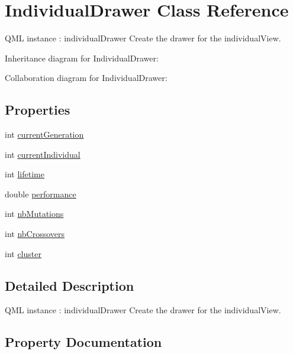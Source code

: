 \hypertarget{class_individual_drawer}{}\section{Individual\+Drawer Class Reference}
\label{class_individual_drawer}


Q\+ML instance \+: individual\+Drawer Create the drawer for the individual\+View.  




Inheritance diagram for Individual\+Drawer\+:


Collaboration diagram for Individual\+Drawer\+:
\subsection*{Properties}
\begin{DoxyCompactItemize}
\item 
int \hyperlink{class_individual_drawer_aebff3d29013ea6abdefb6e5e14b54c2e}{current\+Generation}
\item 
int \hyperlink{class_individual_drawer_aa8e4b9e5d8b6357fd5dd571dbca04a9d}{current\+Individual}
\item 
int \hyperlink{class_individual_drawer_a006e2962467eea003ae5f00287dc539b}{lifetime}
\item 
double \hyperlink{class_individual_drawer_a7d7dc8a2d50bab0ede8b3c9fad4976ac}{performance}
\item 
int \hyperlink{class_individual_drawer_ac2d3ea0b17000b0c1e23b6a3859bdf4e}{nb\+Mutations}
\item 
int \hyperlink{class_individual_drawer_a9b33f984de4074a35771b8a90ada230e}{nb\+Crossovers}
\item 
int \hyperlink{class_individual_drawer_ad54d843b2fef71c5e24a8f9ee565ee96}{cluster}
\end{DoxyCompactItemize}


\subsection{Detailed Description}
Q\+ML instance \+: individual\+Drawer Create the drawer for the individual\+View. 

\subsection{Property Documentation}
\mbox{\label{class_individual_drawer_ad54d843b2fef71c5e24a8f9ee565ee96}} 
